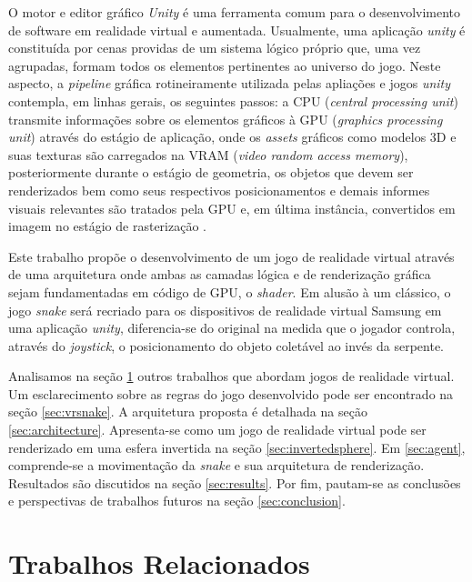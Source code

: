 \documentclass[conference]{IEEEtran}
\begin{document}
O motor e editor gráfico \textit{Unity} é uma ferramenta comum para o desenvolvimento de software em realidade virtual e aumentada. Usualmente, uma aplicação \textit{unity} é constituída por cenas providas de um sistema lógico próprio que, uma vez agrupadas, formam todos os elementos pertinentes ao universo do jogo. Neste aspecto, a \textit{pipeline} gráfica rotineiramente utilizada pelas apliações e jogos \textit{unity} contempla, em linhas gerais, os seguintes passos:  a CPU (\textit{central processing unit}) transmite informações sobre os elementos gráficos à GPU (\textit{graphics processing unit}) através do estágio de aplicação, onde os \textit{assets} gráficos como modelos 3D e suas texturas são carregados na VRAM (\textit{video random access memory}), posteriormente durante o estágio de geometria, os objetos que devem ser renderizados bem como seus respectivos posicionamentos e demais informes visuais relevantes são tratados pela GPU e, em última instância, convertidos em imagem no estágio de rasterização \cite{akenine2008real}.

Este trabalho propõe o desenvolvimento de um jogo de realidade virtual através de uma arquitetura onde ambas as camadas lógica e de renderização gráfica sejam fundamentadas em código de GPU, o \textit{shader}. Em alusão à um clássico, o jogo \textit{snake} será recriado para os dispositivos de realidade virtual Samsung em uma aplicação \textit{unity}, diferencia-se do original na medida que o jogador controla, através do \textit{joystick}, o posicionamento do objeto coletável ao invés da serpente.

Analisamos na seção \ref{sec:relatedworks} outros trabalhos que abordam jogos de realidade virtual. Um esclarecimento sobre as regras do jogo desenvolvido pode ser encontrado na seção \ref{sec:vrsnake}. A arquitetura proposta é detalhada na seção \ref{sec:architecture}. Apresenta-se como um jogo de realidade virtual pode ser renderizado em uma esfera invertida na seção \ref{sec:invertedsphere}. Em \ref{sec:agent}, comprende-se a movimentação da \textit{snake} e sua arquitetura de renderização. Resultados são discutidos na seção \ref{sec:results}. Por fim, pautam-se as conclusões e perspectivas de trabalhos futuros na seção \ref{sec:conclusion}.

\section{Trabalhos Relacionados} \label{sec:relatedworks}
\end{document}
